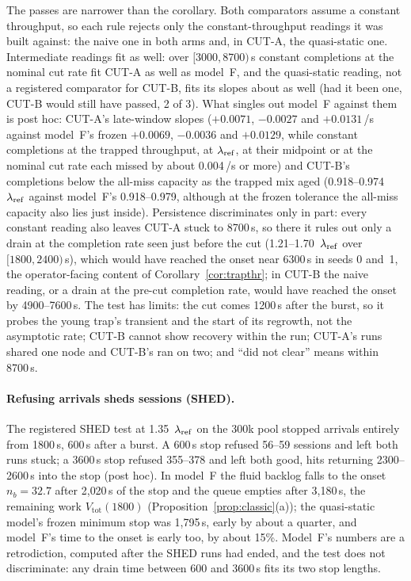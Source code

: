The passes are narrower than the corollary. Both comparators assume a constant throughput, so each rule rejects only the
constant-throughput readings it was built against: the naive one in both arms and, in CUT-A, the quasi-static one. Intermediate
readings fit as well: over $[3000,8700)$\,s constant completions at the nominal cut rate fit CUT-A as well as model~F, and the
quasi-static reading, not a registered comparator for CUT-B, fits its slopes about as well (had it been one, CUT-B would still have
passed, 2 of 3). What singles out model~F against them is post hoc: CUT-A's late-window slopes ($+0.0071$, $-0.0027$ and $+0.0131$\,/s
against model~F's frozen $+0.0069$, $-0.0036$ and $+0.0129$, while constant completions at the trapped throughput, at $\lambda_{\mathrm{ref}}$, at their
midpoint or at the nominal cut rate each missed by about 0.004\,/s or more) and CUT-B's completions below the all-miss capacity as the trapped mix aged (0.918--0.974~$\lambda_{\mathrm{ref}}$ against model~F's
0.918--0.979, although at the frozen tolerance the all-miss capacity also lies just inside). Persistence discriminates only in part:
every constant reading also leaves CUT-A stuck to 8700\,s, so there it rules out only a drain at the completion rate seen just before
the cut (1.21--1.70~$\lambda_{\mathrm{ref}}$ over $[1800,2400)$\,s), which would have reached the onset near 6300\,s in seeds 0 and~1, the operator-facing
content of Corollary~\ref{cor:trapthr}; in CUT-B the naive reading, or a drain at the pre-cut completion rate, would have reached the
onset by 4900--7600\,s. The test has limits: the cut comes 1200\,s after the burst, so it probes the young trap's transient and the start
of its regrowth, not the asymptotic rate; CUT-B cannot show recovery within the run; CUT-A's runs shared one node and CUT-B's ran on
two; and ``did not clear'' means within 8700\,s.

\paragraph{Refusing arrivals sheds sessions (SHED).} The registered SHED test at 1.35~$\lambda_{\mathrm{ref}}$ on the 300k pool stopped arrivals
entirely from 1800\,s, 600\,s after a burst. A 600\,s stop refused 56--59 sessions and left both runs stuck; a 3600\,s stop refused
355--378 and left both good, hits returning 2300--2600\,s into the stop (post hoc). In model~F the fluid backlog falls to the onset $n_b=32.7$
after 2{,}020\,s of the stop and the queue empties after 3{,}180\,s, the remaining work $V_{\mathrm{tot}}(1800)$
(Proposition~\ref{prop:classic}(a)); the quasi-static model's frozen minimum stop was 1{,}795\,s, early by about a quarter, and
model~F's time to the onset is early too, by about 15\%. Model~F's numbers are a retrodiction, computed after the SHED runs had ended,
and the test does not discriminate: any drain time between 600 and 3600\,s fits its two stop lengths.

